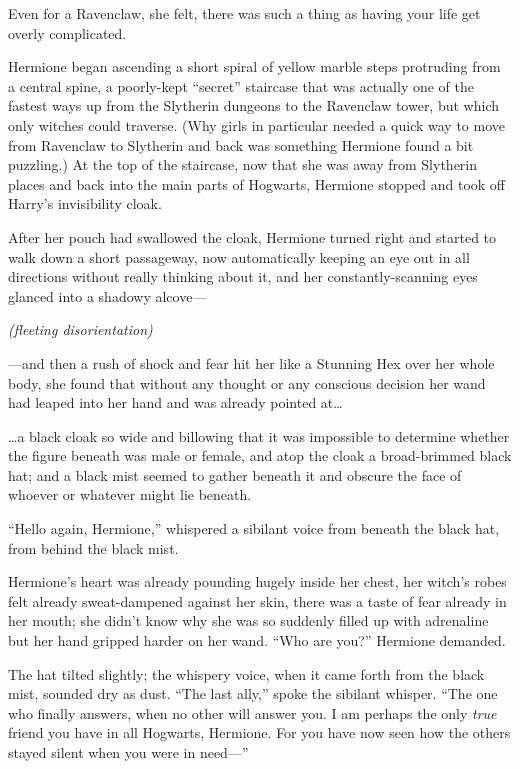 Even for a Ravenclaw, she felt, there was such a thing as having your
life get overly complicated.

Hermione began ascending a short spiral of yellow marble steps
protruding from a central spine, a poorly-kept ``secret'' staircase that
was actually one of the fastest ways up from the Slytherin dungeons to
the Ravenclaw tower, but which only witches could traverse. (Why girls
in particular needed a quick way to move from Ravenclaw to Slytherin and
back was something Hermione found a bit puzzling.) At the top of the
staircase, now that she was away from Slytherin places and back into the
main parts of Hogwarts, Hermione stopped and took off Harry's
invisibility cloak.

After her pouch had swallowed the cloak, Hermione turned right and
started to walk down a short passageway, now automatically keeping an
eye out in all directions without really thinking about it, and her
constantly-scanning eyes glanced into a shadowy alcove---

\emph{(fleeting disorientation)}

---and then a rush of shock and fear hit her like a Stunning Hex over
her whole body, she found that without any thought or any conscious
decision her wand had leaped into her hand and was already pointed
at\ldots{}

\ldots{}a black cloak so wide and billowing that it was impossible to
determine whether the figure beneath was male or female, and atop the
cloak a broad-brimmed black hat; and a black mist seemed to gather
beneath it and obscure the face of whoever or whatever might lie
beneath.

``Hello again, Hermione,'' whispered a sibilant voice from beneath the
black hat, from behind the black mist.

Hermione's heart was already pounding hugely inside her chest, her
witch's robes felt already sweat-dampened against her skin, there was a
taste of fear already in her mouth; she didn't know why she was so
suddenly filled up with adrenaline but her hand gripped harder on her
wand. ``Who are you?'' Hermione demanded.

The hat tilted slightly; the whispery voice, when it came forth from the
black mist, sounded dry as dust. ``The last ally,'' spoke the sibilant
whisper. ``The one who finally answers, when no other will answer you. I
am perhaps the only \emph{true} friend you have in all Hogwarts,
Hermione. For you have now seen how the others stayed silent when you
were in need---''

